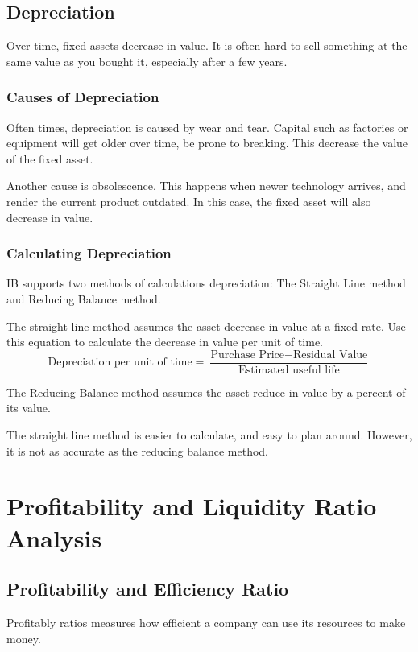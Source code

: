 \documentclass{standalone}
\begin{document}
\subsection{Depreciation}
Over time, fixed assets decrease in value.
It is often hard to sell something at the same value as you bought it, especially after a few years.

\subsubsection{Causes of Depreciation}
Often times, depreciation is caused by wear and tear.
Capital such as factories or equipment will get older over time, be prone to breaking.
This decrease the value of the fixed asset.

Another cause is obsolescence.
This happens when newer technology arrives, and render the current product outdated.
In this case, the fixed asset will also decrease in value.

\subsubsection{Calculating Depreciation}
IB supports two methods of calculations depreciation:
The Straight Line method and Reducing Balance method.

The straight line method assumes the asset decrease in value at a fixed rate.
Use this equation to calculate the decrease in value per unit of time.
\begin{equation}
    \textrm{Depreciation per unit of time} = \frac{\textrm{Purchase Price} - \textrm{Residual Value}}{\textrm{Estimated useful life}}
\end{equation}

The Reducing Balance method assumes the asset reduce in value by a percent of its value.

The straight line method is easier to calculate, and easy to plan around.
However, it is not as accurate as the reducing balance method.

\section{Profitability and Liquidity Ratio Analysis}

\subsection{Profitability and Efficiency Ratio}
Profitably ratios measures how efficient a company can use its resources to make money.
\end{document}
